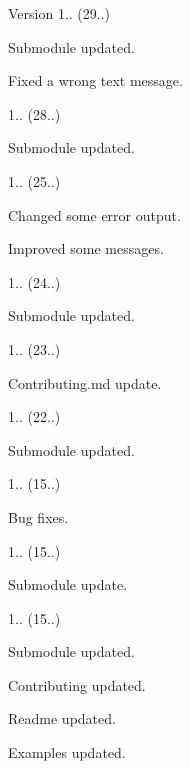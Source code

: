 \begin{DoxyVersion}{Version}
1.. (29..)
\begin{DoxyItemize}
\item Submodule updated.
\item Fixed a wrong text message. 
\end{DoxyItemize}

1.. (28..)
\begin{DoxyItemize}
\item Submodule updated. 
\end{DoxyItemize}

1.. (25..)
\begin{DoxyItemize}
\item Changed some error output.
\item Improved some messages. 
\end{DoxyItemize}

1.. (24..)
\begin{DoxyItemize}
\item Submodule updated. 
\end{DoxyItemize}

1.. (23..)
\begin{DoxyItemize}
\item Contributing.\+md update. 
\end{DoxyItemize}

1.. (22..)
\begin{DoxyItemize}
\item Submodule updated. 
\end{DoxyItemize}

1.. (15..)
\begin{DoxyItemize}
\item Bug fixes. 
\end{DoxyItemize}

1.. (15..)
\begin{DoxyItemize}
\item Submodule update. 
\end{DoxyItemize}

1.. (15..)
\begin{DoxyItemize}
\item Submodule updated.
\item Contributing updated.
\item Readme updated.
\item Examples updated. 
\end{DoxyItemize}


\end{DoxyVersion}
